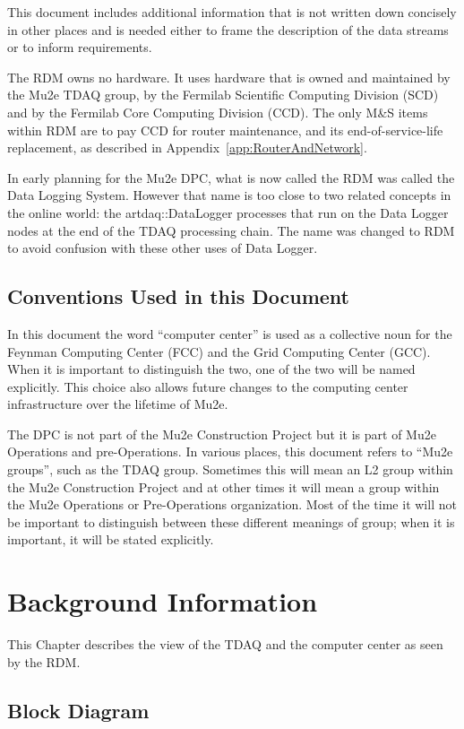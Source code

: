 This document includes additional information that is not written down concisely
in other places and is needed either to frame the description of the data streams
or to inform requirements.


The RDM owns no hardware.  It uses hardware that is owned and maintained
by the Mu2e TDAQ group,
by the Fermilab Scientific Computing Division (SCD)
and by the Fermilab Core Computing Division (CCD).
The only M\&S items within RDM are to pay CCD for router maintenance,
and its end-of-service-life replacement, as described in Appendix~\ref{app:RouterAndNetwork}.

In early planning for the Mu2e DPC, what is now called the RDM was called the Data Logging System.
However that name is too close to two related concepts in the online world:
the {\code artdaq::DataLogger} processes that run on the Data Logger nodes at the end of the TDAQ
processing chain.  The name was changed to RDM to avoid confusion with these other uses of Data Logger.

\section{Conventions Used in this Document}

In this document the word ``computer center'' is used as a collective noun for the
Feynman Computing Center (FCC) and the Grid Computing Center (GCC).
When it is important to distinguish the two, one of the two will be named explicitly.
This choice also allows future changes to the computing center infrastructure over the
lifetime of Mu2e.

The DPC is not part of the Mu2e Construction Project but it is part of Mu2e Operations
and pre-Operations.
In various places, this document refers to ``Mu2e groups'', such as the TDAQ group.
Sometimes this will mean an L2 group within the Mu2e Construction Project and at other
times it will mean a group within the Mu2e Operations or Pre-Operations organization.
Most of the time it will not be important to distinguish between these different meanings
of group; when it is important, it will be stated explicitly.


\chapter{Background Information}
\label{chap:BackgroundInfo}
This Chapter describes the view of the TDAQ and the computer center as seen by the RDM.

\section{Block Diagram}
\label{sec:BlockDiagram}


